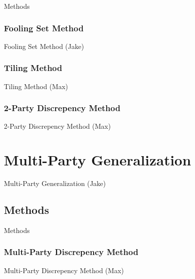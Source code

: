 \documentclass{beamer}
\begin{document}
\begin{frame}{Methods}
\TODO
\tableofcontents[currentsection]
\end{frame}

\subsubsection{Fooling Set Method}

\begin{frame}{Fooling Set Method (Jake)}
\TODO
\end{frame}

\subsubsection{Tiling Method}

\begin{frame}{Tiling Method (Max)}
\TODO
\end{frame}

\subsubsection{2-Party Discrepency Method}

\begin{frame}{2-Party Discrepency Method (Max)}
\TODO
\end{frame}

\section{Multi-Party Generalization}

\begin{frame}{Multi-Party Generalization (Jake)}
\TODO
\end{frame}

\subsection{Methods}

\begin{frame}{Methods}
\TODO
\tableofcontents[currentsection]
\end{frame}

\subsubsection{Multi-Party Discrepency Method}

\begin{frame}{Multi-Party Discrepency Method (Max)}
\TODO
\end{frame}
\end{document}
